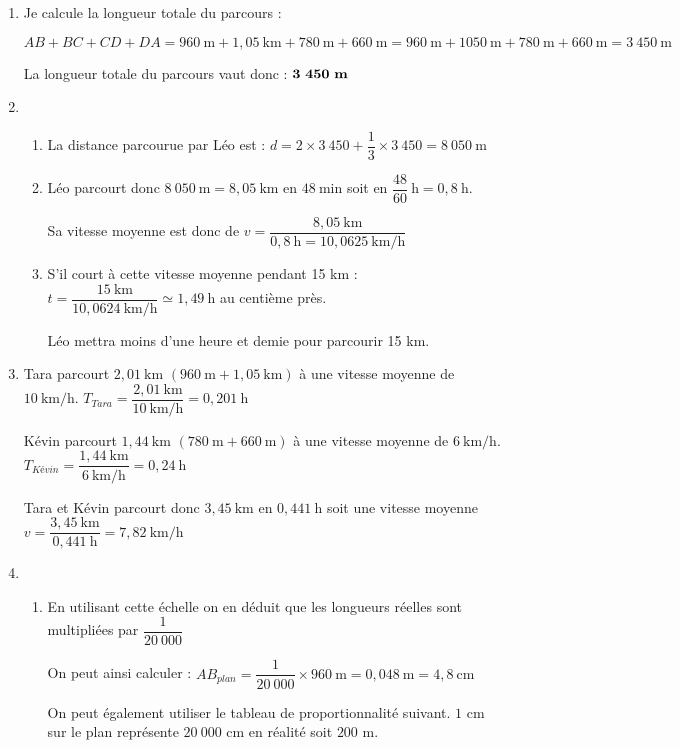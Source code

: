 \begin{enumerate}
\item Je calcule la longueur totale du parcours :

$AB + BC + CD + DA = 960~\text{m} + 1,05~\text{km} + 780~\text{m} + 660~\text{m} = 960~\text{m} + 1050~\text{m} + 780~\text{m} + 660~\text{m} = 3~450~\text{m}$

La longueur totale du parcours vaut donc : $\mathbf{3~450~\text{\textbf{m}}}$
\item 
	\begin{enumerate}
		\item La distance parcourue par Léo est : $ d = 2 \times 3~450+\dfrac{1}{3}\times 3~450 = 8~050~\text{m}$
		\item Léo parcourt donc $8~050~\text{m} = 8,05~\text{km}$ en $48~\text{min}$ soit en $\dfrac{48}{60}~\text{h} = 0,8~\text{h}$.
		
		Sa vitesse moyenne est donc de $v=\dfrac{8,05~\text{km}}{0,8~\text{h}=10,0625~\text{km/h}}$
		\item S'il court à cette vitesse moyenne pendant 15 km : $t=\dfrac{15~\text{km}}{10,0624~\text{km/h}} \simeq 1,49~\text{h}$ au centième près.
		
		Léo mettra moins d’une heure et demie pour parcourir 15 km.
	\end{enumerate}
\item Tara parcourt $2,01~\text{km}$ $(960~\text{m} + 1,05~\text{km})$ à une vitesse moyenne de $10~\text{km/h}$. $T_{Tara}=\dfrac{2,01~\text{km}}{10~\text{km/h}}=0,201~\text{h}$

Kévin parcourt $1,44~\text{km}$ $(780~\text{m} + 660~\text{m})$ à une vitesse moyenne de $6~\text{km/h}$.
$T_{Kévin}=\dfrac{1,44~\text{km}}{6~\text{km/h}}=0,24~\text{h}$

Tara et Kévin parcourt donc $3,45~\text{km}$ en $0,441~\text{h}$ soit une vitesse moyenne
$v=\dfrac{3,45~\text{km}}{0,441~\text{h}}=7,82~\text{km/h}$
\item 
	\begin{enumerate}
		\item En utilisant cette échelle on en déduit que les longueurs réelles sont multipliées par $\dfrac{1}{20~000}$
		
		On peut ainsi calculer : $AB_{plan}= \dfrac{1}{20~000}\times 960~\text{m}=0,048~\text{m}=4,8~\text{cm}$
		
		On peut également utiliser le tableau de proportionnalité suivant. $1$ cm sur le plan représente $20~000$ cm en réalité soit $200$ m.
		

\end{enumerate}
\end{enumerate}
